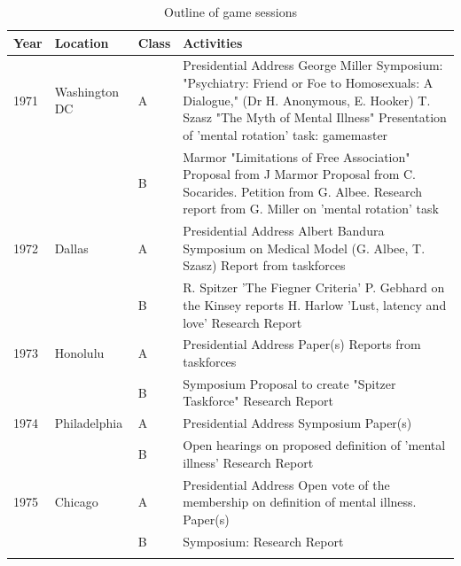  \begin{longtable}[!t]{ | p{1cm} | p{2cm} | p{1cm} | p{10cm} | }
\hline

\textbf{Year}&\textbf{Location}&\textbf{Class}&\textbf{Activities} \\ \hline
1971&Washington DC&A&Presidential Address\: George Miller \newline
Symposium: "Psychiatry: Friend or Foe to Homosexuals: A Dialogue," (Dr H. Anonymous, E. Hooker)\newline
T. Szasz "The Myth of Mental Illness"\newline
Presentation of 'mental rotation' task: gamemaster\\

&&B&

Marmor "Limitations of Free Association"\newline
Proposal from J Marmor\newline
Proposal from C. Socarides.\newline
Petition from G. Albee.\newline
Research report from G. Miller on 'mental rotation' task\\ \hline
1972&Dallas&A&Presidential Address\: Albert Bandura\newline
Symposium on Medical Model (G. Albee, T. Szasz)\newline
Report from taskforces\\
&&B&
R. Spitzer 'The Fiegner Criteria'\newline
P. Gebhard on the Kinsey reports\newline
H. Harlow 'Lust, latency and love'\newline
Research Report\\ \hline
1973&Honolulu&A&
Presidential Address\: \newline
Paper(s) \newline
Reports from taskforces\\
&&B&
Symposium\:\newline
Proposal to create "Spitzer Taskforce"\newline
Research Report\\ \hline
1974&Philadelphia&A
&Presidential Address\:\newline
Symposium\:\newline
Paper(s)\\
&&B&
Open hearings on proposed definition of 'mental illness'\newline
Research Report\\ \hline
1975&Chicago&A&
Presidential Address\:\newline
Open vote of the membership on definition of mental illness.\newline
Paper(s)\\
&&B&
Symposium:\newline
Research Report\\
\hline

\caption{Outline of game sessions}
\label{table: outlineGameSessions}
\end{longtable}

